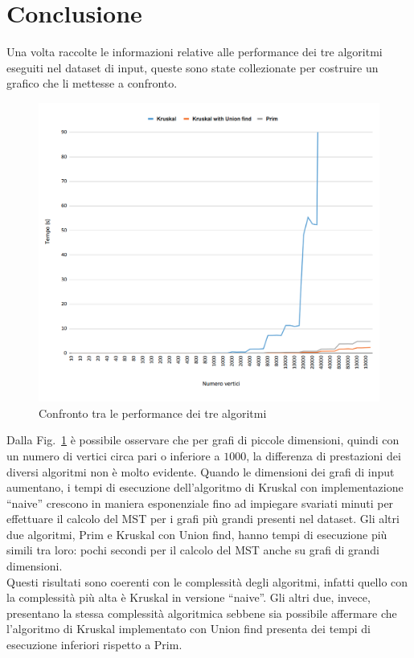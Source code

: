\section{Conclusione}

Una volta raccolte le informazioni relative alle performance dei tre algoritmi eseguiti nel dataset di input, queste sono state collezionate per costruire un grafico che li mettesse a confronto.

\begin{figure}[H]
	\hspace{-1cm}\includegraphics[width=19cm]{Img/compare.png}
	\caption{Confronto tra le performance dei tre algoritmi}
	\label{comparison}
\end{figure}

Dalla Fig.~\ref{comparison} è possibile osservare che per grafi di piccole dimensioni, quindi con un numero di vertici circa pari o inferiore a $1000$, la differenza di prestazioni dei diversi algoritmi non è molto evidente. 
Quando le dimensioni dei grafi di input aumentano, i tempi di esecuzione dell'algoritmo di Kruskal con implementazione ``naive'' crescono in maniera esponenziale fino ad impiegare svariati minuti per effettuare il calcolo del MST per i grafi più grandi presenti nel dataset. 
Gli altri due algoritmi, Prim e Kruskal con Union find, hanno tempi di esecuzione più simili tra loro: pochi secondi per il calcolo del MST anche su grafi di grandi dimensioni. \\
Questi risultati sono coerenti con le complessità degli algoritmi, infatti quello con la complessità più alta è Kruskal in versione ``naive''. 
Gli altri due, invece, presentano la stessa complessità algoritmica sebbene sia possibile affermare che l'algoritmo di Kruskal implementato con Union find presenta dei tempi di esecuzione inferiori rispetto a Prim.

\pagebreak
